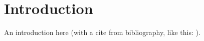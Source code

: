 \section{Introduction}

An introduction here (with a cite from bibliography, like this: \cite{greenwade93}).

